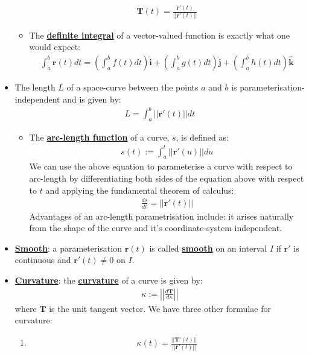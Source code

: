 \documentclass[11pt]{article}
\newcommand{\dfn}[1]{\underline{\textbf{#1}}}
\begin{document}
\begin{itemize}[noitemsep]
\begin{itemize}
\begin{align}
				\mathbf{T}(t) = \frac{\mathbf{r}'(t)}{|| \mathbf{r}'(t) ||}
		\end{align}
		\item The \dfn{definite integral} of a vector-valued function is exactly what one would expect: 
		\begin{align}
			\int_a^b \mathbf{r}(t) dt = \left( \int_a^b f(t) dt \right) \mathbf{\hat{i}} + \left( \int_a^b g(t) dt \right) \mathbf{\hat{j}} + \left( \int_a^b h(t) dt \right) \mathbf{\hat{k}}  
		\end{align}
	\end{itemize}
	\item The length $L$ of a space-curve between the points $a$ and $b$ is parameterisation-independent and is given by:
	\begin{align}
		L = \int_a^b || \mathbf{r}'(t) || dt 	
	\end{align}
	\begin{itemize}[noitemsep]
		\item The \dfn{arc-length function} of a curve, $s$, is defined as: 
		\begin{align}
			s(t) := \int_a^t || \mathbf{r}'(u) || du 	
		\end{align}
		We can use the above equation to parameterise a curve with respect to arc-length by differentiating both sides of the equation above with respect to $t$ and applying the fundamental theorem of calculus: 
		\begin{align}
			\frac{ds}{dt} = || \mathbf{r}'(t) ||	
		\end{align}
		Advantages of an arc-length parametrisation include: it arises naturally from the shape of the curve and it's coordinate-system independent. 
	\end{itemize}
	\item \dfn{Smooth}: a parameterisation $\mathbf{r}(t)$ is called \dfn{smooth} on an interval $I$ if $\mathbf{r}'$ is continuous and $\mathbf{r}'(t) \neq 0$ on $I$. 
	\item \dfn{Curvature}: the \dfn{curvature} of a curve is given by: 
	\begin{align}
		\kappa := \left| \left| \frac{d \mathbf{T}}{ds} \right| \right| 	
	\end{align}
	where $\mathbf{T}$ is the unit tangent vector. We have three other formulae for curvature: 
	\begin{enumerate}[noitemsep]
		\item 
		\begin{align}
			\kappa(t) = \frac{|| \mathbf{T}'(t) ||}{|| \mathbf{r}'(t) ||}	

\end{align}
\end{enumerate}
\end{itemize}
\end{document}
